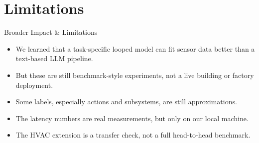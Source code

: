 \section{Limitations}

\begin{frame}{Broader Impact \& Limitations}
  \begin{itemize}
    \item We learned that a task-specific looped model can fit sensor data better than a text-based LLM pipeline.
    \item But these are still benchmark-style experiments, not a live building or factory deployment.
    \item Some labels, especially actions and subsystems, are still approximations.
    \item The latency numbers are real measurements, but only on our local machine.
    \item The HVAC extension is a transfer check, not a full head-to-head benchmark.
  \end{itemize}
\end{frame}
